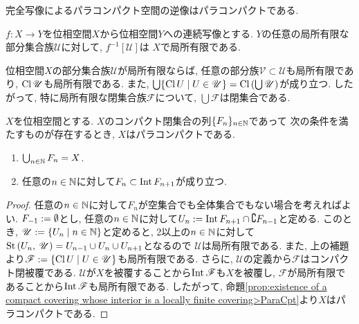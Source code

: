 \documentclass[uplatex, dvipdfmx, a4paper, 12pt, class=jsbook, crop=false]{standalone}
\begin{document}
\begin{proposition}
	完全写像によるパラコンパクト空間の逆像はパラコンパクトである.
\end{proposition}

\begin{proposition}
	$ f \colon X \to Y $を位相空間$ X $から位相空間$ Y $への連続写像とする.
	$ Y $の任意の局所有限な部分集合族$ \mathscr{U} $に対して, $ f^{-1}[\mathscr{U}] $は
	$ X $で局所有限である.
\end{proposition}

\begin{proposition}
	\label{lem:every closure of any locally finite family of subsets is locally finite}
	位相空間$ X $の部分集合族$ \mathscr{U} $が局所有限ならば,
	任意の部分族$ \mathscr{V} \subset \mathscr{U} $も局所有限であり,
	$ \mathop{\mathrm{Cl}}\nolimits \mathscr{U} $も局所有限である.
	また, $ \bigcup \setcomp{\topcl U}{U \in \mathscr{U}} = \topcl \left(\bigcup \mathscr{U}\right)$が成り立つ.
	したがって, 特に局所有限な閉集合族$ \mathscr{F} $について,
	$ \bigcup \mathscr{F} $は閉集合である.
\end{proposition}

\begin{proposition}
	\label{prop:characterization of paracompactness by a family of compact closed sets}
	$ X $を位相空間とする. $ X $のコンパクト閉集合の列$ \{F_n\}_{n \in \mathbb{N}} $であって
	次の条件を満たすものが存在するとき, $ X $はパラコンパクトである.
	\begin{enumerate}
		\item $ \bigcup_{n \in \mathbb{N}} F_n = X $.
		\item 任意の$ n \in \mathbb{N} $に対して$ F_n \subset \mathop{\mathrm{Int}}\nolimits F_{n+1} $が成り立つ.
	\end{enumerate}
\end{proposition}

\begin{proof}
	任意の$ n \in \mathbb{N} $に対して$ F_n $が空集合でも全体集合でもない場合を考えればよい.
	$ F_{-1} \mathrel{:=} \emptyset $とし, 任意の$ n \in \mathbb{N} $に対して$ U_n \mathrel{:=} \mathop{\mathrm{Int}}\nolimits F_{n+1} \cap \complement F_{n-1} $と定める.
	このとき, $ \mathscr{U} \defeq \setcomp{U_n}{n \in \N} $と定めると,
	2以上の$ n \in \mathbb{N} $に対して$ \mathrm{St}\left(U_n , \: \mathscr{U}\right) = U_{n-1} \cup U_n \cup U_{n+1} $となるので
	$ \mathscr{U} $は局所有限である. また, 上の補題より$ \mathscr{F} \defeq \setcomp{\topcl U}{U \in \mathscr{U}} $も局所有限である.
	さらに, $ \mathscr{U} $の定義から$ \mathscr{F} $はコンパクト閉被覆である.
	$ \mathscr{U} $が$ X $を被覆することから$ \mathop{\mathrm{Int}}\nolimits \mathscr{F} $も$ X $を被覆し,
	$ \mathscr{F} $が局所有限であることから$ \mathop{\mathrm{Int}}\nolimits \mathscr{F} $も局所有限である.
	したがって, 命題\ref{prop:existence of a compact covering whose interior is a locally finite covering>ParaCpt}より$ X $はパラコンパクトである.
\end{proof}
\end{document}
